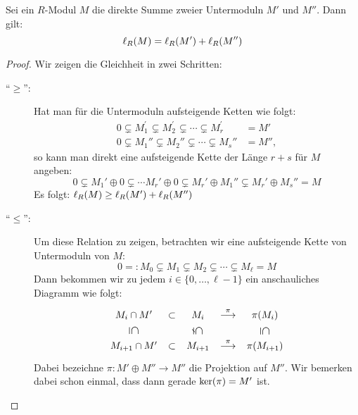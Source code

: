 \begin{thLemma}
    Sei ein $R$-Modul $M$ die direkte Summe zweier Untermoduln $M'$ und $M''$.
    Dann gilt:
    \[ \operatorname{\ell}_{R}(M) = \operatorname{\ell}_{R}(M') + \operatorname{\ell}_{R}(M'') \]
\end{thLemma}
\begin{proof}
    Wir zeigen die Gleichheit in zwei Schritten:
    \begin{description}
        \item[\enquote{\boldmath$\geq$}:]
            Hat man für die Untermoduln aufsteigende Ketten wie folgt:
            \begin{align*}
                0 \subsetneq M_1^{\prime\phantom\prime} \subsetneq
                            M_2^{\prime\phantom\prime} 
                            \subsetneq \cdots 
                            \subsetneq M_r^{\prime\phantom\prime}  &= M'    \\
                0 \subsetneq M_1'' \subsetneq M_2'' 
                            \subsetneq \cdots \subsetneq M_s'' &= M''
                ,
            \end{align*}
            so kann man direkt eine aufsteigende Kette der Länge $r+s$ für $M$
            angeben:
            \[ 0 \subsetneq M_1' \oplus 0 \subsetneq \cdots M_r' \oplus 0
                \subsetneq M_r' \oplus M_1'' \subsetneq M_r' \oplus M_s'' = M \]
            Es folgt: $\operatorname{\ell}_{R}(M) \geq \operatorname{\ell}_{R}(M') + \operatorname{\ell}_{R}(M'')$
            
        \item[\enquote{\boldmath$\leq$}:]
            Um diese Relation zu zeigen, betrachten wir eine aufsteigende Kette
            von Untermoduln von $M$:
            \[ 0 =: M_0 \subsetneq M_1 \subsetneq M_2 \subsetneq \cdots
            \subsetneq M_\ell = M \]
            Dann bekommen wir zu jedem $i\in\{0,\ldots,\ell-1\}$ ein anschauliches
            Diagramm wie folgt:
            \begin{equation*}
                \begin{xy}
                    \xymatrix@C=5pt@R=13pt{
                        M_i\cap M' \ar@{}[d]|-*[@][*1.2]{\subseteq}  & \subset
                        & M_i      \ar@{}[d]|-*[@][*1.2]{\subsetneq} & \overset\pi\longto
                        & \pi(M_i) \ar@{}[d]|-*[@][*1.2]{\subseteq}
                        \\
                        M_{i+1}\cap M' & \subset
                        & M_{i+1} & \overset\pi\longto
                        & \pi(M_{i+1})
                    }
                \end{xy}
            \end{equation*}
            Dabei bezeichne $\pi\colon M'\oplus M'' \to M''$ die Projektion auf
            $M''$. Wir bemerken dabei schon einmal, dass dann gerade 
            $\operatorname{ker}(\pi) = M'$ ist.
            

\end{description}
\end{proof}
